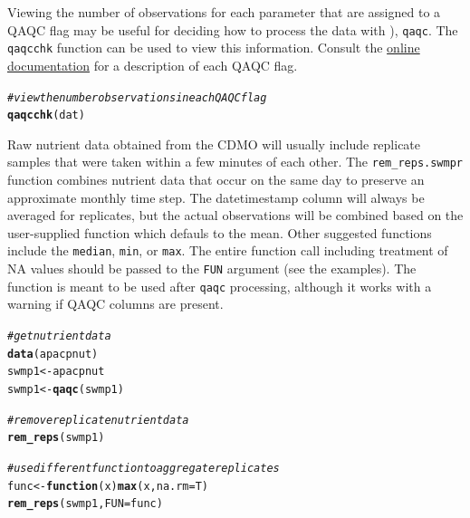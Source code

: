 \documentclass[10pt,letterpaper]{article}\usepackage[]{graphicx}\usepackage[]{color}
\makeatletter
\newcommand{\hlcom}[1]{\textcolor[rgb]{0.678,0.584,0.686}{\textit{#1}}}%
\newcommand{\hlstd}[1]{\textcolor[rgb]{0.345,0.345,0.345}{#1}}%
\newcommand{\hlkwa}[1]{\textcolor[rgb]{0.161,0.373,0.58}{\textbf{#1}}}%
\newcommand{\hlkwb}[1]{\textcolor[rgb]{0.69,0.353,0.396}{#1}}%
\newcommand{\hlkwc}[1]{\textcolor[rgb]{0.333,0.667,0.333}{#1}}%
\newcommand{\hlkwd}[1]{\textcolor[rgb]{0.737,0.353,0.396}{\textbf{#1}}}%
\newenvironment{kframe}{%
 \def\at@end@of@kframe{}%
 \ifinner\ifhmode%
  \def\at@end@of@kframe{\end{minipage}}%
  \begin{minipage}{\columnwidth}%
 \fi\fi%
 \def\FrameCommand##1{\hskip\@totalleftmargin \hskip-\fboxsep
 \colorbox{shadecolor}{##1}\hskip-\fboxsep
     \hskip-\linewidth \hskip-\@totalleftmargin \hskip\columnwidth}%
 \MakeFramed {\advance\hsize-\width
   \@totalleftmargin\z@ \linewidth\hsize
   \@setminipage}}%
 {\par\unskip\endMakeFramed%
 \at@end@of@kframe}
\newenvironment{knitrout}{}{} %
\makeatother
\begin{document}
Viewing the number of observations for each parameter that are assigned to a QAQC flag may be useful for deciding how to process the data with ), \texttt{qaqc}.  The \texttt{qaqcchk} function can be used to view this information.  Consult the \href{http://cdmo.baruch.sc.edu/data/qaqc.cfm}{online documentation} for a description of each QAQC flag. 

\begin{knitrout}
\color{fgcolor}\begin{kframe}
\begin{alltt}
\hlcom{# view the number observations in each QAQC flag}
\hlkwd{qaqcchk}\hlstd{(dat)}
\end{alltt}
\end{kframe}
\end{knitrout}

Raw nutrient data obtained from the \ac{CDMO} will usually include replicate samples that were taken within a few minutes of each other.  The \texttt{rem\_reps.swmpr} function combines nutrient data that occur on the same day to preserve an approximate monthly time step.  The datetimestamp column will always be averaged for replicates, but the actual observations will be combined based on the user-supplied function which defauls to the mean.  Other suggested functions include the \texttt{median}, \texttt{min}, or \texttt{max}.  The entire function call including treatment of NA values should be passed to the \texttt{FUN} argument (see the examples).  The function is meant to be used after \texttt{qaqc} processing, although it works with a warning if QAQC columns are present.

\begin{knitrout}
\color{fgcolor}\begin{kframe}
\begin{alltt}
\hlcom{# get nutrient data}
\hlkwd{data}\hlstd{(apacpnut)}
\hlstd{swmp1} \hlkwb{<-} \hlstd{apacpnut}
\hlstd{swmp1} \hlkwb{<-} \hlkwd{qaqc}\hlstd{(swmp1)}

\hlcom{# remove replicate nutrient data}
\hlkwd{rem_reps}\hlstd{(swmp1)}

\hlcom{# use different function to aggregate replicates}
\hlstd{func} \hlkwb{<-} \hlkwa{function}\hlstd{(}\hlkwc{x}\hlstd{)} \hlkwd{max}\hlstd{(x,} \hlkwc{na.rm} \hlstd{= T)}
\hlkwd{rem_reps}\hlstd{(swmp1,} \hlkwc{FUN} \hlstd{= func)}
\end{alltt}
\end{kframe}
\end{knitrout}
\end{document}
